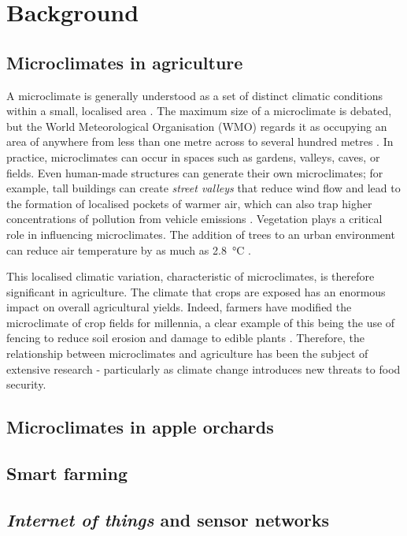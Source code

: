 \section{Background}

\subsection{Microclimates in agriculture}

A microclimate is generally understood as a set of distinct climatic conditions
within a small, localised area \cite{MetOffice2023}. The maximum
size of a microclimate is debated, but the World Meteorological Organisation
(WMO) regards it as occupying an area of anywhere from less than one metre
across to several hundred metres \cite{wmo2024}.  In practice, microclimates can
occur in spaces such as gardens, valleys, caves, or fields. Even human-made
structures can generate their own microclimates; for example, tall buildings can
create \emph{street valleys} that reduce wind flow and lead to the formation of
localised pockets of warmer air, which can also trap higher concentrations of
pollution from vehicle emissions \cite{yang2023}. Vegetation plays a critical
role in influencing microclimates. The addition of trees to an urban environment
can reduce air temperature by as much as \SI{2.8}{\degreeCelsius}
\cite{lai2019}.

This localised climatic variation, characteristic of microclimates, is therefore
significant in agriculture. The climate that crops are exposed has an enormous
impact on overall agricultural yields. Indeed, farmers have modified the
microclimate of crop fields for millennia, a clear example of this being the use
of fencing to reduce soil erosion and damage to edible plants \cite{cleugh1998}.
Therefore, the relationship between microclimates and agriculture has been the
subject of extensive research - particularly as climate change introduces new
threats to food security.

\subsection{Microclimates in apple orchards}



\subsection{Smart farming}

\subsection{\emph{Internet of things} and sensor networks}
